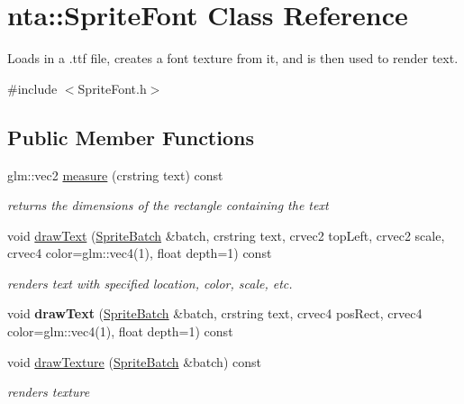 \hypertarget{classnta_1_1SpriteFont}{}\section{nta\+:\+:Sprite\+Font Class Reference}
\label{classnta_1_1SpriteFont}


Loads in a .ttf file, creates a font texture from it, and is then used to render text.  




{\ttfamily \#include $<$Sprite\+Font.\+h$>$}

\subsection*{Public Member Functions}
\begin{DoxyCompactItemize}
\item 
\mbox{\label{classnta_1_1SpriteFont_a195ee5502390cd373463a774641a4677}} 
glm\+::vec2 \hyperlink{classnta_1_1SpriteFont_a195ee5502390cd373463a774641a4677}{measure} (crstring text) const
\begin{DoxyCompactList}\small\item\em returns the dimensions of the rectangle containing the text \end{DoxyCompactList}\item 
\mbox{\label{classnta_1_1SpriteFont_a86e0d5974a15cb477355bed3d38fc932}} 
void \hyperlink{classnta_1_1SpriteFont_a86e0d5974a15cb477355bed3d38fc932}{draw\+Text} (\hyperlink{classnta_1_1SpriteBatch}{Sprite\+Batch} \&batch, crstring text, crvec2 top\+Left, crvec2 scale, crvec4 color=glm\+::vec4(1), float depth=1) const
\begin{DoxyCompactList}\small\item\em renders text with specified location, color, scale, etc. \end{DoxyCompactList}\item 
\mbox{\label{classnta_1_1SpriteFont_a728928c2a94f4ffa2f004e89f9e049f8}} 
void {\bfseries draw\+Text} (\hyperlink{classnta_1_1SpriteBatch}{Sprite\+Batch} \&batch, crstring text, crvec4 pos\+Rect, crvec4 color=glm\+::vec4(1), float depth=1) const
\item 
\mbox{\label{classnta_1_1SpriteFont_ac5e60e0a7b6f9c0302c81f0d5b6628cc}} 
void \hyperlink{classnta_1_1SpriteFont_ac5e60e0a7b6f9c0302c81f0d5b6628cc}{draw\+Texture} (\hyperlink{classnta_1_1SpriteBatch}{Sprite\+Batch} \&batch) const
\begin{DoxyCompactList}\small\item\em renders texture \end{DoxyCompactList}\end{DoxyCompactItemize}
